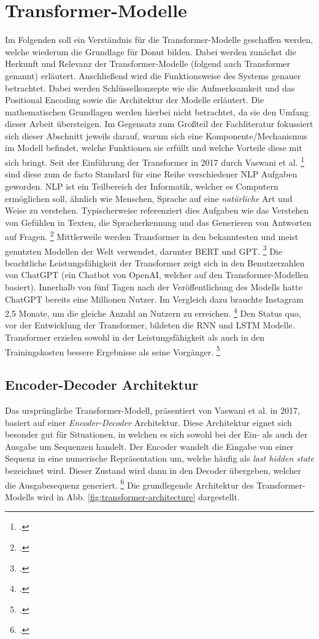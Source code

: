\section{Transformer-Modelle}
Im Folgenden soll ein Verständnis für die Transformer-Modelle geschaffen werden, welche wiederum die Grundlage für Donut bilden. Dabei werden zunächst die Herkunft und Relevanz der Transformer-Modelle (folgend auch Transformer genannt) erläutert. Anschließend wird die Funktionsweise des Systems genauer betrachtet. Dabei werden Schlüsselkonzepte wie die Aufmerksamkeit und das Positional Encoding sowie die Architektur der Modelle erläutert. Die mathematischen Grundlagen werden hierbei nicht betrachtet, da sie den Umfang dieser Arbeit übersteigen. Im Gegensatz zum Großteil der Fachliteratur fokussiert sich dieser Abschnitt jeweils darauf, warum sich eine Komponente/Mechanismus im Modell befindet, welche Funktionen sie erfüllt und welche Vorteile diese mit sich bringt. Seit der Einführung der Transformer in 2017 durch Vaswani et al. \footcites{vaswani_attention_2017} sind diese zum de facto Standard für eine Reihe verschiedener \ac{NLP} Aufgaben geworden. \ac{NLP} ist ein Teilbereich der Informatik, welcher es Computern ermöglichen soll, ähnlich wie Menschen, Sprache auf eine \emph{natürliche} Art und Weise zu verstehen. Typischerweise referenziert dies Aufgaben wie das Verstehen von Gefühlen in Texten, die Spracherkennung und das Generieren von Antworten auf Fragen. \footcites[Vgl.][S. 1]{beysolow_ii_applied_2018} Mittlerweile werden Transformer in den bekanntesten und meist genutzten Modellen der Welt verwendet, darunter BERT und GPT. \footcites[Vgl.][S. 1]{tunstall_natural_2022} Die beachtliche Leistungsfähigkeit der Transformer zeigt sich in den Benutzerzahlen von ChatGPT (ein Chatbot von OpenAI, welcher auf den Transformer-Modellen basiert). Innerhalb von fünf Tagen nach der Veröffentlichung des Modells hatte ChatGPT bereits eine Millionen Nutzer. Im Vergleich dazu brauchte Instagram 2,5 Monate, um die gleiche Anzahl an Nutzern zu erreichen. \footcites[Vgl.][]{buchholz_infographic_2023} Den Status quo, vor der Entwicklung der Transformer, bildeten die \ac{RNN} und \ac{LSTM} Modelle. Transformer erzielen sowohl in der Leistungsfähigkeit als auch in den Trainingskosten bessere Ergebnisse als seine Vorgänger. \footcites[Vgl.][S. 1]{tunstall_natural_2022}

\subsection{Encoder-Decoder Architektur}
Das ursprüngliche Transformer-Modell, präsentiert von Vaswani et al. in 2017, basiert auf einer \emph{Encoder-Decoder} Architektur. Diese Architektur eignet sich besonder gut für Situationen, in welchen es sich sowohl bei der Ein- als auch der Ausgabe um Sequenzen handelt. Der Encoder wandelt die Eingabe von einer Sequenz in eine numerische Repräsentation um, welche häufig als \emph{last hidden state} bezeichnet wird. Dieser Zustand wird dann in den Decoder übergeben, welcher die Ausgabesequenz generiert. \footcites[Vgl.][S. 3 ff.]{tunstall_natural_2022} Die grundlegende Architektur des Transformer-Modells wird in Abb. \ref{fig:transformer-architecture} dargestellt. 

